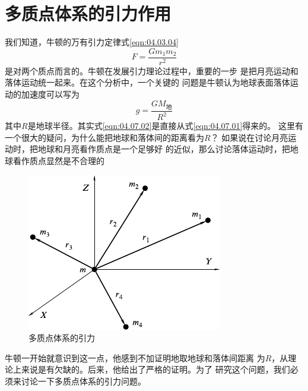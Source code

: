 \section{多质点体系的引力作用}\label{sec:04.07}

我们知道，牛顿的万有引力定律式\eqref{eqn:04.03.04}
\begin{equation}\label{eqn:04.07.01}
  F = \frac { G m _ { 1 } m _ { 2 } } { r ^ { 2 } }
\end{equation}
是对两个质点而言的。牛顿在发展引力理论过程中，重要的一步
是把月亮运动和落体运动统一起来。在这个分析中，一个关键的
问题是牛顿认为地球表面落体运动的加速度可以写为
\begin{equation}\label{eqn:04.07.02}
  g = \frac { G M _ \text{地} } { R ^ { 2 } }
\end{equation}
其中$ R $是地球半径。其实式\eqref{eqn:04.07.02}是直接从式\eqref{eqn:04.07.01}得来的。
这里有一个很大的疑问，为什么能把地球和落体间的距离看为$ R $？
如果说在讨论月亮运动时，把地球和月亮看作质点是一个足够好
的近似，那么讨论落体运动时，把地球看作质点显然是不合理的
\begin{figure}
  \centering
  \includegraphics{figure/fig04.09}
  \caption{多质点体系的引力}
  \label{fig:04.09}
\end{figure}
牛顿一开始就意识到这一点，他感到不加证明地取地球和落体间距离
为$ R $，从理论上来说是有欠缺的。后来，他给出了严格的证明。为了
研究这个问题，我们必须来讨论一下多质点体系的引力问题。

